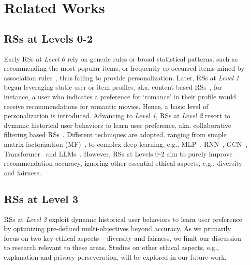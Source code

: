 \section{Related Works}
\subsection{RSs at Levels 0-2} 
Early RSs at \textit{Level 0} rely on generic rules or broad statistical patterns, such as recommending the most popular items, or frequently co-occurred items mined by association rules~\cite{sun2019research}, thus failing to provide personalization.
%
Later, RSs at \textit{Level 1} began leveraging static user or item profiles, aka. content-based RSs~\cite{sun2019research}, for instance, a user who indicates a preference for `romance' in their profile would receive recommendations for romantic movies. Hence, a basic level of personalization is introduced.
%
Advancing to \textit{Level 1}, RSs at \textit{Level 2} resort to dynamic historical user behaviors to learn user preference, aka. collaborative filtering based RSs~\cite{sun2019research}. Different techniques are adopted, ranging from simple matrix factorization (MF)~\cite{he2016vbpr}, to complex deep learning, e.g., MLP~\cite{sun2024self}, RNN~\cite{sun2023theoretically}, GCN~\cite{peng2024less}, Transformer~\cite{zhang2022next} and LLMs~\cite{liu2024large,wang2025re2llm}.  
%
However, RSs at Levels 0-2 aim to purely improve recommendation accuracy, ignoring other essential ethical aspects, e.g., diversity and fairness. 
 
\subsection{RSs at Level 3}
RSs at \textit{Level 3} exploit dynamic historical user behaviors to learn user preference by optimizing pre-defined multi-objectives beyond accuracy. As we primarily focus on two key ethical aspects -- diversity and fairness, we limit our discussion to research relevant to these areas. Studies on other ethical aspects, e.g., explanation and privacy-perseveration, will be explored in our future work.  

